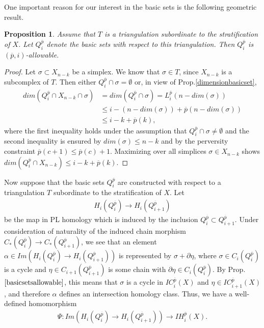 \documentclass{scrreprt}
\newtheorem{prop}{Proposition}[chapter]
\begin{document}
One important reason for our interest in the basic sets is the following geometric result.

\begin{prop}\label{basicsetsallowable}
Assume that $T$ is a triangulation subordinate to the stratification of $X$. Let $Q_i^{\overline{p}}$
denote the basic sets with respect to this triangulation. Then $Q_i^{\overline{p}}$ is $(\overline{p},i)$-allowable.
\end{prop}

\begin{proof}
Let $\sigma \subset X_{n-k}$ be a simplex. We know that $\sigma \in T$, since $X_{n-k}$ is a subcomplex of $T$. Then either $Q_i^{\overline{p}} \cap \sigma= \emptyset$ or, in view of Prop.\ref{dimensionbasicset},
\begin{align*}
dim(Q_i^{\overline{p}} \cap X_{n-k} \cap \sigma) &=dim(Q_i^{\overline{p}} \cap \sigma)=L_i^{\overline{p}}(n-dim(\sigma)) \\ &\leq i - (n- dim(\sigma))+ \overline{p}(n-dim(\sigma)) \\ &\leq i-k+ \overline{p}(k),
\end{align*}
where the first inequality holds under the assumption that $Q_i^{\overline{p}} \cap \sigma \neq \emptyset$ and the second inequality is ensured by $dim(\sigma) \leq n-k$ and by the perversity constraint $\overline{p}(c+1) \leq \overline{p}(c)+1$. Maximizing over all simplices $\sigma \in X_{n-k}$ shows
$dim(Q_i^{\overline{p}} \cap X_{n-k} ) \leq i-k+ \overline{p}(k).$
\end{proof}

Now suppose that the basic sets $Q_i^{\overline{p}}$ are constructed with respect to a triangulation $T$ subordinate to the stratification of $X$. Let 
\begin{align*}
H_i(Q_{i}^{\overline{p}}) \to H_i(Q_{i+1}^{\overline{p}})
\end{align*}
be the map in PL homology which is induced by the inclusion $Q_i^{\overline{p}} \subset Q_{i+1}^{\overline{p}}$. Under consideration of naturality of the induced chain morphism $C_*(Q_i^{\overline{p}}) \to C_*(Q_{i+1}^{\overline{p}})$, we see that an element $\alpha \in Im(H_i(Q_{i}^{\overline{p}}) \to H_i(Q_{i+1}^{\overline{p}}))$ is represented by $\sigma+ \partial \eta$, where $\sigma \in C_i(Q_i^{\overline{p}})$ is a cycle and $\eta \in  C_{i+1}(Q_{i+1}^{\overline{p}})$
is some chain with $\partial \eta \in C_i(Q_i^{\overline{p}})$. By Prop.$\ref{basicsetsallowable}$, this means that $\sigma$ is a cycle in $IC_i^{\overline{p}}(X)$ and $\eta \in IC_{i+1}^{\overline{p}}(X)$, and therefore $\alpha$ defines an intersection homology class. Thus, we have a well-defined homomorphism
\begin{align*}
\Psi: Im(H_i(Q_{i}^{\overline{p}}) \to H_i(Q_{i+1}^{\overline{p}})) \to IH_i^{\overline{p}}(X).
\end{align*}
\end{document}

